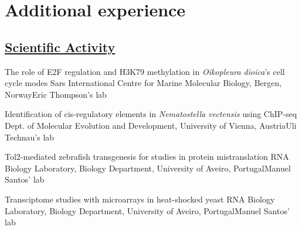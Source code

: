 \documentclass[11pt,a4paper,roman]{moderncv} %
\begin{document}
\section{Additional experience}

    \subsection{\underline{Scientific Activity}}

            {The role of E2F regulation and H3K79 methylation in \textit{Oikopleura dioica}'s cell cycle modes}
            {Sars International Centre for Marine Molecular Biology, Bergen, Norway}{Eric Thompson's lab}
            {}
            {}
        
            {Identification of cis-regulatory elements in \textit{Nematostella vectensis} using ChIP-seq}
            {Dept. of Molecular Evolution and Development, University of Vienna, Austria}{Uli Technau's lab}
            {}
            {}

            {Tol2-mediated zebrafish transgenesis for studies in protein mistranslation}
            {RNA Biology Laboratory, Biology Department, University of Aveiro, Portugal}{Manuel Santos' lab}
            {}
            {}

            {Transciptome studies with microarrays in heat-shocked yeast}
            {RNA Biology Laboratory, Biology Department, University of Aveiro, Portugal}{Manuel Santos' lab}
            {}
            {}
\end{document}
